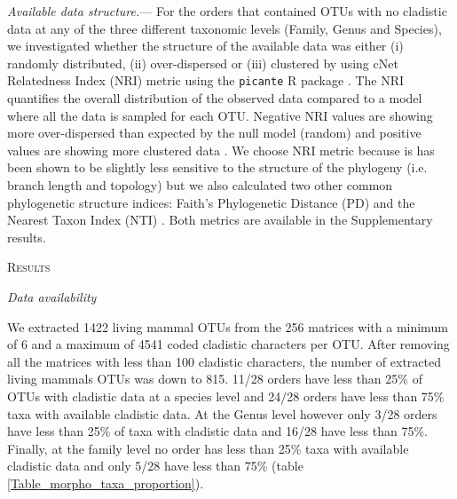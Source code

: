 \documentclass[12pt,letterpaper]{article}
\renewcommand{\section}[1]{%
\bigskip
\begin{center}
\begin{Large}
\normalfont\scshape #1
\medskip
\end{Large}
\end{center}}
\renewcommand{\subsection}[1]{%
\bigskip
\begin{center}
\begin{large}
\normalfont\itshape #1
\end{large}
\end{center}}
\renewcommand{\subsubsection}[1]{%
\vspace{2ex}
\noindent
\textit{#1.}---}
\begin{document}
\subsubsection{Available data structure}
For the orders that contained OTUs with no cladistic data at any of the three different taxonomic levels (Family, Genus and Species), we investigated whether the structure of the available data was either (i) randomly distributed, (ii) over-dispersed or (iii) clustered by using cNet Relatedness Index (NRI) metric \citep{webb2002phylogenies} using the \texttt{picante} R package \citep{picante}.
The NRI quantifies the overall distribution of the observed data compared to a model where all the data is sampled for each OTU. Negative NRI values are showing more over-dispersed than expected by the null model (random) and positive values are showing more clustered data \citep{webb2002phylogenies}.
We choose NRI metric because is has been shown to be slightly less sensitive to the structure of the phylogeny (i.e. branch length and topology) \citep{NRI,journal.pone.0004390} but we also calculated two other common phylogenetic structure indices: Faith's Phylogenetic Distance (PD) \citep{Faith19921} and the Nearest Taxon Index (NTI) \citep{webb2002phylogenies}.
Both metrics are available in the Supplementary results.


%
%

\section{Results}

\subsection{Data availability}
We extracted 1422 living mammal OTUs from the 256 matrices with a minimum of 6 and a maximum of 4541 coded cladistic characters per OTU.
After removing all the matrices with less than 100 cladistic characters, the number of extracted living mammals OTUs was down to 815.
11/28 orders have less than 25\% of OTUs with cladistic data at a species level and 24/28 orders have less than 75\% taxa with available cladistic data.
At the Genus level however only 3/28 orders have less than 25\% of taxa with cladistic data and 16/28 have less than 75\%.
Finally, at the family level no order has less than 25\% taxa with available cladistic data and only 5/28 have less than 75\% (table \ref{Table_morpho_taxa_proportion}).
\end{document}
